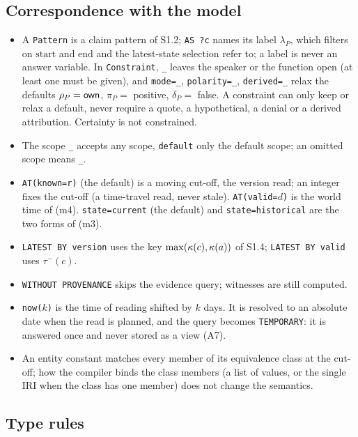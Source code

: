 \subsection{Correspondence with the model}

\begin{itemize}
\item A \texttt{Pattern} is a claim pattern of S1.2; \texttt{AS ?c} names its label $\lambda_P$,
  which filters on $\mathrm{start}$ and $\mathrm{end}$ and the latest-state selection refer to; a
  label is never an answer variable. In \texttt{Constraint}, \texttt{\_} leaves the speaker or the
  function open (at least one must be given), and \texttt{mode=\_}, \texttt{polarity=\_},
  \texttt{derived=\_} relax the defaults $\rho_P=\textsf{own}$, $\pi_P=$ positive, $\delta_P=$ false.
  A constraint can only keep or relax a default, never require a quote, a hypothetical, a denial or
  a derived attribution. Certainty is not constrained.
\item The scope \texttt{\_} accepts any scope, \texttt{default} only the default scope; an omitted
  scope means \texttt{\_}.
\item \texttt{AT(known=r)} (the default) is a moving cut-off, the version read; an integer fixes the
  cut-off (a time-travel read, never stale). \texttt{AT(valid=}$d$\texttt{)} is the world time of
  (m4). \texttt{state=current} (the default) and \texttt{state=historical} are the two forms of
  (m3).
\item \texttt{LATEST BY version} uses the key $\max(\kappa(c),\kappa(a))$ of S1.4; \texttt{LATEST BY
  valid} uses $\tau^-(c)$.
\item \texttt{WITHOUT PROVENANCE} skips the evidence query; witnesses are still computed.
\item \texttt{now(}$k$\texttt{)} is the time of reading shifted by $k$ days. It is resolved to an
  absolute date when the read is planned, and the query becomes \texttt{TEMPORARY}: it is answered
  once and never stored as a view (A7).
\item An entity constant matches every member of its equivalence class at the cut-off; how the
  compiler binds the class members (a list of values, or the single IRI when the class has one
  member) does not change the semantics.
\end{itemize}

\subsection{Type rules}

